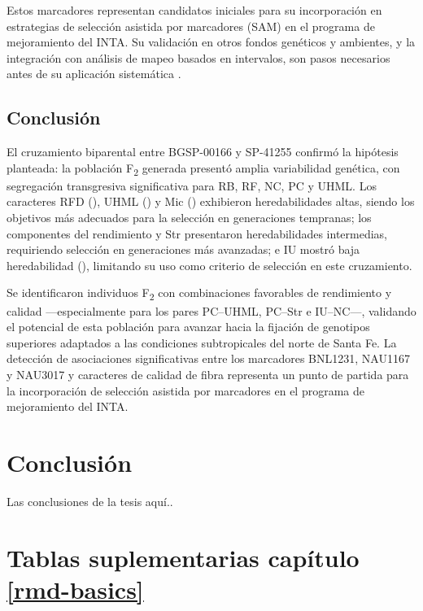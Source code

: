\documentclass[12pt,oneside]{reedthesis}
\begin{document}
Estos marcadores representan candidatos iniciales para su incorporación en estrategias de selección asistida por marcadores (SAM) en el programa de mejoramiento del INTA. Su validación en otros fondos genéticos y ambientes, y la integración con análisis de mapeo basados en intervalos, son pasos necesarios antes de su aplicación sistemática \autocite{devicente1993}.

\section{Conclusión}\label{conclusiuxf3n-1}

El cruzamiento biparental entre BGSP-00166 y SP-41255 confirmó la hipótesis planteada: la población F\textsubscript{2} generada presentó amplia variabilidad genética, con segregación transgresiva significativa para RB, RF, NC, PC y UHML. Los caracteres RFD (), UHML () y Mic () exhibieron heredabilidades altas, siendo los objetivos más adecuados para la selección en generaciones tempranas; los componentes del rendimiento y Str presentaron heredabilidades intermedias, requiriendo selección en generaciones más avanzadas; e IU mostró baja heredabilidad (), limitando su uso como criterio de selección en este cruzamiento.

Se identificaron individuos F\textsubscript{2} con combinaciones favorables de rendimiento y calidad ---especialmente para los pares PC--UHML, PC--Str e IU--NC---, validando el potencial de esta población para avanzar hacia la fijación de genotipos superiores adaptados a las condiciones subtropicales del norte de Santa Fe. La detección de asociaciones significativas entre los marcadores BNL1231, NAU1167 y NAU3017 y caracteres de calidad de fibra representa un punto de partida para la incorporación de selección asistida por marcadores en el programa de mejoramiento del INTA.

\chapter*{Conclusión}\label{conclusiuxf3n-2}

Las conclusiones de la tesis aquí..

\appendix

\chapter{Tablas suplementarias capítulo \ref{rmd-basics}}\label{tablas-suplementarias-capuxedtulo-refrmd-basics}
\end{document}
